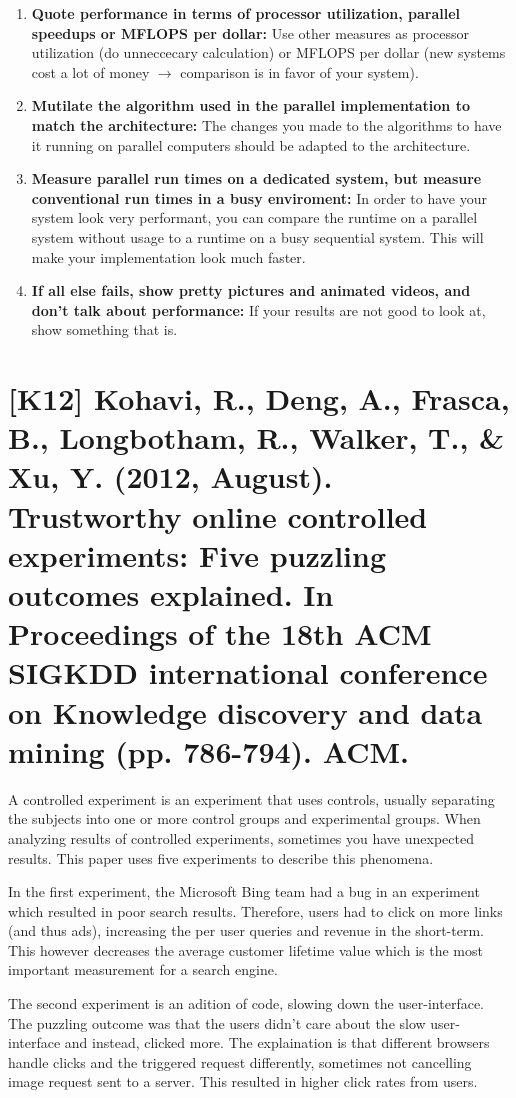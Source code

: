 \documentclass[a4paper,12pt,english]{scrartcl}
\newcommand{\papertitle}[2]{
	\section{[#1] #2}
}
\begin{document}
\begin{enumerate}[noitemsep]
	\item \textbf{Quote performance in terms of processor utilization, parallel speedups or MFLOPS per dollar:} Use other measures as processor utilization (do unneccecary calculation) or MFLOPS per dollar (new systems cost a lot of money $\rightarrow$ comparison is in favor of your system).
	\item \textbf{Mutilate the algorithm used in the parallel implementation to match the architecture:} The changes you made to the algorithms to have it running on parallel computers should be adapted to the architecture.
	\item \textbf{Measure parallel run times on a dedicated system, but measure conventional run times in a busy enviroment:} In order to have your system look very performant, you can compare the runtime on a parallel system without usage to a runtime on a busy sequential system. This will make your implementation look much faster.
	\item \textbf{If all else fails, show pretty pictures and animated videos, and don't talk about performance:} If your results are not good to look at, show something that is.
\end{enumerate}

\newpage

\papertitle{K12}{Kohavi, R., Deng, A., Frasca, B., Longbotham, R., Walker, T., \& Xu, Y. (2012, August). Trustworthy online controlled experiments: Five puzzling outcomes explained. In Proceedings of the 18th ACM SIGKDD international conference on Knowledge discovery and data mining (pp. 786-794). ACM.}

A controlled experiment is an experiment that uses controls, usually separating the subjects into one or more control groups and experimental groups. When analyzing results of controlled experiments, sometimes you have unexpected results. This paper uses five experiments to describe this phenomena.

In the first experiment, the Microsoft Bing team had a bug in an experiment which resulted in poor search results. Therefore, users had to click on more links (and thus ads), increasing the per user queries and revenue in the short-term. This however decreases the average customer lifetime value which is the most important measurement for a search engine.

The second experiment is an adition of code, slowing down the user-interface. The puzzling outcome was that the users didn't care about the slow user-interface and instead, clicked more. The explaination is that different browsers handle clicks and the triggered request differently, sometimes not cancelling image request sent to a server. This resulted in higher click rates from users.
\end{document}
